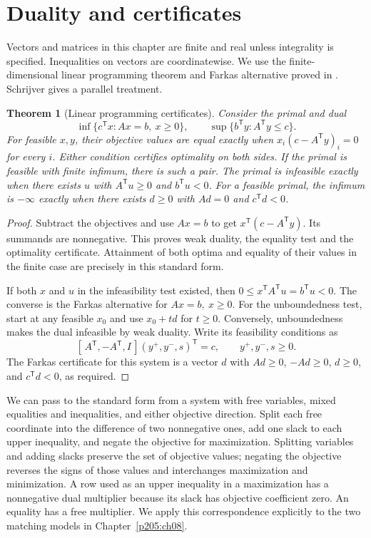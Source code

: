 \documentclass[11pt,oneside,openany]{book}
\theoremstyle{plain}
\newtheorem{theorem}{Theorem}[chapter]
\theoremstyle{definition}
\theoremstyle{remark}
\begin{document}
\section{Duality and certificates}

Vectors and matrices in this chapter are finite and real unless
integrality is specified. Inequalities on vectors are coordinatewise.
We use the finite-dimensional linear programming theorem and Farkas
alternative proved in \cite[Theorems 5.1 and 1.23]{p106}. Schrijver
\cite[vol.~A, Sections 5.4--5.6 and 13.2]{schrijver} gives a parallel
treatment.

\begin{theorem}[Linear programming certificates]\label{p205:W31}
Consider the primal and dual
\[
 \inf\{c^{\mathsf T}x:Ax=b,\ x\ge0\},
 \qquad
 \sup\{b^{\mathsf T}y:A^{\mathsf T}y\le c\}.
\]
For feasible \(x,y\), their objective values are equal exactly when
\(x_i(c-A^{\mathsf T}y)_i=0\) for every \(i\). Either condition certifies
optimality on both sides. If the primal is feasible with finite
infimum, there is such a pair. The primal is infeasible exactly when
there exists \(u\) with \(A^{\mathsf T}u\ge0\) and \(b^{\mathsf T}u<0\).
For a feasible primal, the infimum is \(-\infty\) exactly when there
exists \(d\ge0\) with \(Ad=0\) and \(c^{\mathsf T}d<0\).
\end{theorem}

\begin{proof}
Subtract the objectives and use \(Ax=b\) to get
\(x^{\mathsf T}(c-A^{\mathsf T}y)\). Its summands are nonnegative.
This proves weak duality, the equality test and the optimality
certificate. Attainment of both optima and equality of their values
in the finite case are precisely \cite[Theorem 5.1]{p106} in this
standard form.

If both \(x\) and \(u\) in the infeasibility test existed, then
\(0\le x^{\mathsf T}A^{\mathsf T}u=b^{\mathsf T}u<0\). The converse
is the Farkas alternative for \(Ax=b,\ x\ge0\).
For the unboundedness test, start at any feasible \(x_0\) and use
\(x_0+td\) for \(t\ge0\). Conversely, unboundedness makes the dual
infeasible by weak duality. Write its feasibility conditions as
\[
 [\,A^{\mathsf T},-A^{\mathsf T},I\,](y^+,y^-,s)^{\mathsf T}=c,
 \qquad y^+,y^-,s\ge0 .
\]
The Farkas certificate for this system is a vector \(d\) with
\(Ad\ge0\), \(-Ad\ge0\), \(d\ge0\), and \(c^{\mathsf T}d<0\),
as required.
\end{proof}

We can pass to the standard form from a system with free variables,
mixed equalities and inequalities, and either objective direction.
Split each free coordinate into the difference of two nonnegative
ones, add one slack to each upper inequality, and negate the
objective for maximization. Splitting variables and adding slacks preserve the set of objective
values; negating the objective reverses the signs of those values
and interchanges maximization and minimization. A row used as an upper inequality in a
maximization has a nonnegative dual multiplier because its slack
has objective coefficient zero. An equality has a free multiplier.
We apply this correspondence explicitly to the two matching models
in Chapter~\ref{p205:ch08}.
\end{document}
